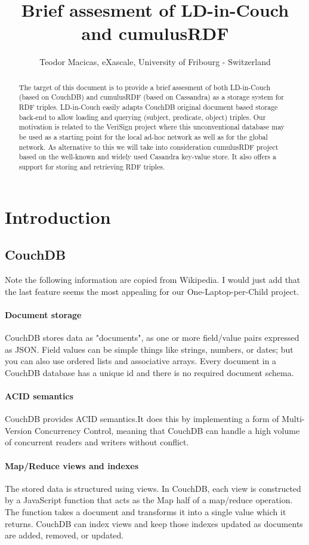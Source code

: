 \documentclass[a4paper,10pt]{article}
\title{Brief assesment of LD-in-Couch and cumulusRDF}
\author{Teodor Macicas, eXascale, University of Fribourg - Switzerland}
\begin{document}
\maketitle
\clearpage
\clearpage

\begin{abstract}
The target of this document is to provide a brief assesment of both LD-in-Couch (based on CouchDB) and cumulusRDF (based on 
Cassandra) as a storage system for RDF triples. LD-in-Couch easily adapts CouchDB original document based storage back-end to 
allow loading and querying (subject, predicate, object) triples. Our motivation is related to the VeriSign project where this unconventional 
database may be used as a starting point for the local ad-hoc network as well as for the global network. 
As alternative to this we will take into consideration cumulusRDF project based on the well-known and widely used Casandra key-value store. 
It also offers a support for storing and retrieving RDF triples. 
\end{abstract}
\vspace{20 mm}

\section{Introduction}
\subsection{CouchDB}
Note the following information are copied from Wikipedia. I would just add that the last feature seems the most appealing for our One-Laptop-per-Child project.
\paragraph{Document storage}
CouchDB stores data as "documents", as one or more field/value pairs expressed as JSON. Field values can be simple things like strings, numbers, 
or dates; but you can also use ordered lists and associative arrays. Every document in a CouchDB database has a unique id and there is no required document schema.
\paragraph{ACID semantics}
CouchDB provides ACID semantics.It does this by implementing a form of Multi-Version Concurrency Control, meaning that CouchDB can handle a high 
volume of concurrent readers and writers without conflict.
\paragraph{Map/Reduce views and indexes}
The stored data is structured using views. In CouchDB, each view is constructed by a JavaScript function that acts as the Map half of a map/reduce operation. 
The function takes a document and transforms it into a single value which it returns. CouchDB can index views and keep those indexes updated as documents 
are added, removed, or updated.
\end{document}
